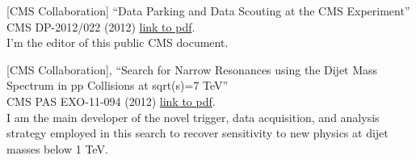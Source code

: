 \documentclass[10pt, a4paper]{article}
\begin{document}
\begin{thebibliography}{599}
 

[CMS Collaboration]
``Data Parking and Data Scouting at the CMS Experiment''
  CMS DP-2012/022 (2012)
  \href{http://cds.cern.ch/record/1480607/files/DP2012\_022.pdf}{link
    to pdf}.
  \\I'm the editor of this public CMS document.

[CMS Collaboration],
``Search for Narrow Resonances using the Dijet Mass Spectrum in pp Collisions at sqrt(s)=7 TeV''\\
  CMS PAS EXO-11-094 (2012)
  \href{http://cds.cern.ch/record/1461223/files/EXO-11-094-pas.pdf}{link
  to pdf}.
  \\ I am the main developer of the novel trigger, data acquisition, and analysis strategy employed in this search to recover sensitivity to new physics at dijet masses below 1 TeV.

  

\end{thebibliography}
\end{document}

